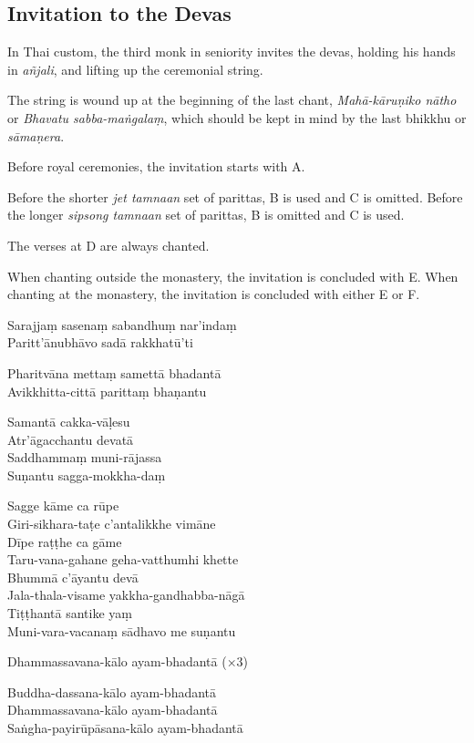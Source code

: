 \subsection{Invitation to the Devas}
\label{paritta-devas}


\enlargethispage{\baselineskip}

In Thai custom, the third monk in seniority invites the devas, holding his
hands in \emph{añjali}, and lifting up the ceremonial string.

The string is wound up at the beginning of the last chant, \emph{Mahā-kāruṇiko
  nātho} or \emph{Bhavatu sabba-maṅgalaṃ}, which should be kept in mind by the
last bhikkhu or \emph{sāmaṇera}.

Before royal ceremonies, the invitation starts with A.

Before the shorter \emph{jet tamnaan} set of parittas, B is used and C is
omitted. Before the longer \emph{sipsong tamnaan} set of parittas, B is
omitted and C is used.

The verses at D are always chanted.

When chanting outside the monastery, the invitation is concluded with E. When
chanting at the monastery, the invitation is concluded with either E or F.

\clearpage

\begin{paritta}


%
Sarajjaṃ sasenaṃ sabandhuṃ nar'indaṃ\\
Paritt'ānubhāvo sadā rakkhatū'ti

%
Pharitvāna mettaṃ samettā bhadantā\\
Avikkhitta-cittā parittaṃ bhaṇantu

%
Samantā cakka-vāḷesu\\
Atr'āgacchantu devatā\\
Saddhammaṃ muni-rājassa\\
Suṇantu sagga-mokkha-daṃ

%
Sagge kāme ca rūpe\\
Giri-sikhara-taṭe c'antalikkhe vimāne\\
Dīpe raṭṭhe ca gāme\\
Taru-vana-gahane geha-vatthumhi khette\\
Bhummā c'āyantu devā\\
Jala-thala-visame yakkha-gandhabba-nāgā\\
Tiṭṭhantā santike yaṃ\\
Muni-vara-vacanaṃ sādhavo me suṇantu

%
Dhammassavana-kālo ayam-bhadantā (×3)


%
Buddha-dassana-kālo ayam-bhadantā\\
Dhammassavana-kālo ayam-bhadantā\\
Saṅgha-payirūpāsana-kālo ayam-bhadantā
\end{paritta}

